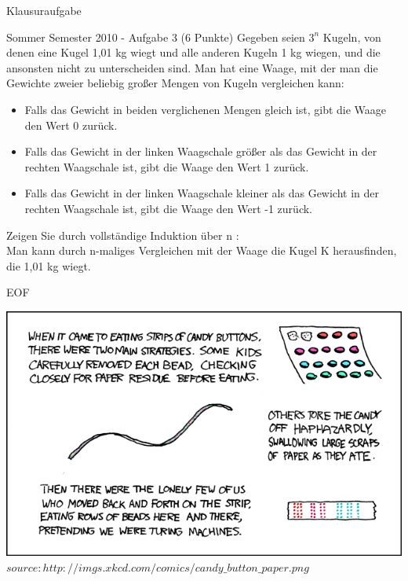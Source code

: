 	
	\begin{frame}{Klausuraufgabe}
		\begin{block}{Sommer Semester 2010 - Aufgabe 3 (6 Punkte)}
			\small
			Gegeben seien $3^n$ Kugeln, von denen eine Kugel 1,01 kg wiegt und alle anderen
			Kugeln 1 kg wiegen, und die ansonsten nicht zu unterscheiden sind.
			Man hat eine Waage, 
			mit der man die Gewichte zweier beliebig großer Mengen von Kugeln vergleichen kann:
			\begin{itemize}
				\item Falls das Gewicht in beiden verglichenen Mengen gleich ist,
				gibt die Waage den Wert 0 zurück.
				
				\item Falls das Gewicht in der linken Waagschale größer als das Gewicht in der 
				rechten Waagschale ist, gibt die Waage den Wert 1 zurück.
						
				\item Falls das Gewicht in der linken Waagschale kleiner als das
				Gewicht in der rechten Waagschale ist, gibt die Waage den Wert -1 zurück.
			\end{itemize}

			Zeigen Sie durch vollständige Induktion über n :\\
			Man kann durch n-maliges Vergleichen mit der Waage die Kugel K herausfinden, 
			die 1,01 kg wiegt.
		\end{block}
	\end{frame}
		
	\begin{frame} {EOF}
		\begin{center}
			\includegraphics[scale=0.45]{graphics/eof13.png}\\
			\tiny $source: http://imgs.xkcd.com/comics/candy\_button\_paper.png$
		\end{center}
	\end{frame}


